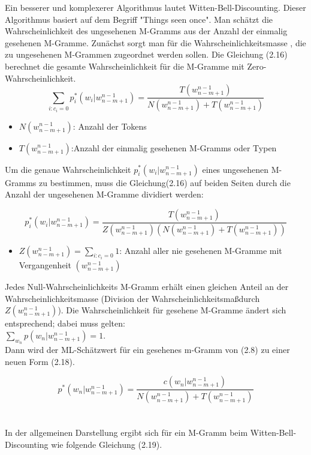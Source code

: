 Ein besserer und komplexerer Algorithmus lautet Witten-Bell-Discounting.
Dieser Algorithmus basiert auf dem Begriff "Things seen once". Man sch\"atzt die Wahrscheinlichkeit des ungesehenen M-Gramms aus der Anzahl der einmalig gesehenen M-Gramme. Zun\"achst sorgt man f\"ur die Wahrscheinlichkeitsmasse , die zu ungesehenen M-Grammen zugeordnet werden sollen. Die Gleichung (2.16) berechnet die  gesamte Wahrscheinlichkeit f\"ur  die M-Gramme mit Zero-Wahrscheinlichkeit.
\begin{equation}
\label{equation:witten_bell_01}
\sum_{i:c_{i}=0}p_{i}^{*}(w_{i}|w_{n-m+1}^{n-1})=\frac{T(w_{n-m+1}^{n-1})}{N(w_{n-m+1}^{n-1})+T(w_{n-m+1}^{n-1})}
\end{equation}
\begin{itemize}
	\item $N(w_{n-m+1}^{n-1})$: Anzahl der Tokens\\
	\item $T(w_{n-m+1}^{n-1})$:Anzahl der einmalig gesehenen M-Gramms oder Typen
\end{itemize}
Um die genaue Wahrscheinlichkeit $p_{i}^{*}(w_{i}|w_{n-m+1}^{n-1})$ eines ungesehenen M-Gramms zu bestimmen, muss die Gleichung(2.16) auf beiden Seiten durch die Anzahl der ungesehenen M-Gramme dividiert werden:

\begin{equation}
\label{equation:witten_bell_02}
p_{i}^{*}(w_{i}|w_{n-m+1}^{n-1})=\frac{T(w_{n-m+1}^{n-1})}{Z(w_{n-m+1}^{n-1})(N(w_{n-m+1}^{n-1})+T(w_{n-m+1}^{n-1}))}
\end{equation}
\begin{itemize}
	\item $Z(w_{n-m+1}^{n-1})=\sum_{i:c_{i}=0}1$: Anzahl aller nie gesehenen M-Gramme mit Vergangenheit $(w_{n-m+1}^{n-1})$
\end{itemize}
Jedes Null-Wahrscheinlichkeits M-Gramm erh\"alt einen gleichen Anteil an der Wahrscheinlichkeitsmasse (Division der Wahrscheinlichkeitsma\ss durch $Z(w_{n-m+1}^{n-1})$).
Die Wahrscheinlichkeit f\"ur gesehene M-Gramme \"andert sich entsprechend; dabei muss gelten:\\ 
$\sum_{w_{n}}p(w_{n}|w_{n-m+1}^{n-1})=1$.\\
Dann wird der ML-Sch\"atzwert  f\"ur ein gesehenes m-Gramm von (2.8) zu einer neuen Form (2.18). 

\begin{equation}
\label{equation:witten_bell_03}
p^{*}(w_{n}|w_{n-m+1}^{n-1})=\frac{c(w_{n}|w_{n-m+1}^{n-1})}{N(w_{n-m+1}^{n-1})+T(w_{n-m+1}^{n-1})}
\end{equation}
\\
\\
In der allgemeinen Darstellung ergibt sich f\"ur ein M-Gramm  beim Witten-Bell-Discounting wie folgende Gleichung (2.19).

